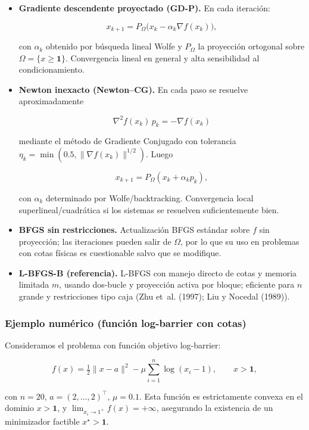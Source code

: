 \documentclass[
  spanish,
  us-letterpaper,
  DIV=11,
  numbers=noendperiod]{scrreprt}
\numberwithin{equation}{section}
\begin{document}
\begin{itemize}
\item
  \textbf{Gradiente descendente proyectado (GD-P).} En cada iteración:

  \[
  x_{k+1} = P_\Omega\big(x_k - \alpha_k \nabla f(x_k)\big),
  \]

  con \(\alpha_k\) obtenido por búsqueda lineal Wolfe y \(P_\Omega\) la
  proyección ortogonal sobre \(\Omega=\{x\ge\mathbf{1}\}\). Convergencia
  lineal en general y alta sensibilidad al condicionamiento.
\item
  \textbf{Newton inexacto (Newton--CG).} En cada paso se resuelve
  aproximadamente

  \[
  \nabla^2 f(x_k)\, p_k = -\nabla f(x_k)
  \]

  mediante el método de Gradiente Conjugado con tolerancia
  \(\eta_k = \min(0.5,\|\nabla f(x_k)\|^{1/2})\). Luego

  \[
  x_{k+1} = P_\Omega(x_k + \alpha_k p_k),
  \]

  con \(\alpha_k\) determinado por Wolfe/backtracking. Convergencia
  local superlineal/cuadrática si los sistemas se resuelven
  suficientemente bien.
\item
  \textbf{BFGS sin restricciones.} Actualización BFGS estándar sobre
  \(f\) sin proyección; las iteraciones pueden salir de \(\Omega\), por
  lo que su uso en problemas con cotas físicas es cuestionable salvo que
  se modifique.
\item
  \textbf{L-BFGS-B (referencia).} L-BFGS con manejo directo de cotas y
  memoria limitada \(m\), usando dos-bucle y proyección activa por
  bloque; eficiente para \(n\) grande y restricciones tipo caja (Zhu
  et~al. (1997); Liu y Nocedal (1989)).
\end{itemize}

\subsubsection{Ejemplo numérico (función log-barrier con
cotas)}\label{ejemplo-numuxe9rico-funciuxf3n-log-barrier-con-cotas}

Consideramos el problema con función objetivo log-barrier:

\[
f(x) = \tfrac{1}{2}\|x-a\|^2 - \mu\sum_{i=1}^n \log(x_i - 1),\qquad x > \mathbf{1},
\tag{3.111}
\]

con \(n=20\), \(a=(2,\dots,2)^\top\), \(\mu=0.1\). Esta función es
estrictamente convexa en el dominio \(x>\mathbf{1}\), y
\(\lim_{x_i\to 1^+}f(x)=+\infty\), asegurando la existencia de un
minimizador factible \(x^\star> \mathbf{1}\).
\end{document}
